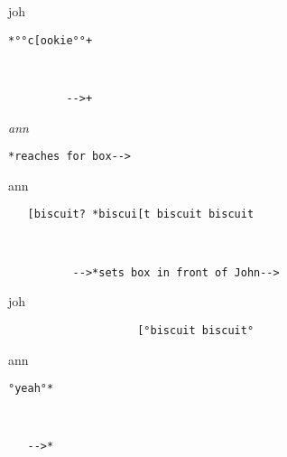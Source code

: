\documentclass[output=paper,nonflat,modfont,draft]{langsci/langscibook}
\begin{document}

\begin{transbox}{13}{joh}
\begin{verbatim}
*°°c[ookie°°+
\end{verbatim}
\end{transbox}

\begin{transbox}{14}{~}
\begin{verbatim}
         -->+
\end{verbatim}
\end{transbox}

\begin{mdframedkendrick}[style=secondfoc]
\begin{transbox}{15}{\textit{ann}}
\begin{verbatim}
*reaches for box-->
\end{verbatim}
\end{transbox}
\end{mdframedkendrick}\vspace{-5mm}

\begin{transbox}{16}{ann}
\begin{verbatim}
   [biscuit? *biscui[t biscuit biscuit
\end{verbatim}
\end{transbox}

\begin{transbox}{17}{~}
\begin{verbatim}
          -->*sets box in front of John-->
\end{verbatim}
\end{transbox}

\begin{transbox}{18}{joh}
\begin{verbatim}
                    [°biscuit biscuit°
\end{verbatim}
\end{transbox}

\begin{transbox}{19}{ann}
\begin{verbatim}
°yeah°*
\end{verbatim}
\end{transbox}

\begin{transbox}{20}{~}
\begin{verbatim}
   -->*
\end{verbatim}
\end{transbox}
\end{document}
